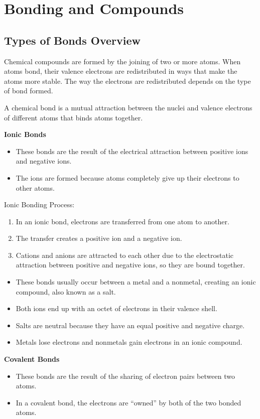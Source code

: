 \documentclass[../hchem.tex]{subfiles}
\begin{document}
\chapter{Bonding and Compounds}
\section{Types of Bonds Overview}
Chemical compounds are formed by the joining of two or more atoms. When atoms bond, their 
valence electrons are redistributed in ways that make the atoms more stable. The way the electrons are redistributed 
depends on the type of bond formed.

A chemical bond is a mutual attraction between the nuclei and valence electrons of different atoms that binds atoms together.

\textbf{Ionic Bonds}
\begin{itemize}
    \item These bonds are the result of the electrical attraction between positive ions and negative ions.
    \item The ions are formed because atoms completely give up their electrons to other atoms.
\end{itemize}

Ionic Bonding Process:
\begin{enumerate}
    \item In an ionic bond, electrons are transferred from one atom to another.
    \item The transfer creates a positive ion and a negative ion.
    \item Cations and anions are attracted to each other due to the electrostatic attraction between positive and negative ions, so they are bound together.
\end{enumerate}

\begin{itemize}
    \item These bonds usually occur between a metal and a nonmetal, creating an ionic compound, also known as a salt.
    \item Both ions end up with an octet of electrons in their valence shell.
    \item Salts are neutral because they have an equal positive and negative charge.
    \item Metals lose electrons and nonmetals gain electrons in an ionic compound.
\end{itemize}

\textbf{Covalent Bonds}
\begin{itemize}
    \item These bonds are the result of the sharing of electron pairs between two atoms.
    \item In a covalent bond, the electrons are ``owned'' by both of the two bonded atoms.
\end{itemize}
\end{document}
